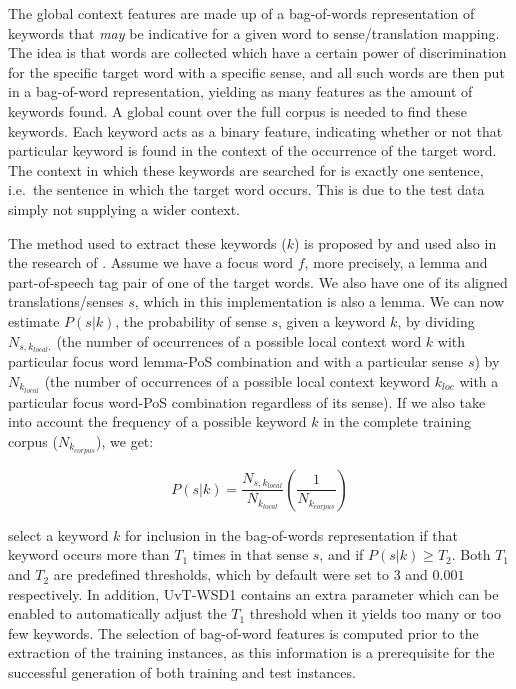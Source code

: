 The global context features are made up of a bag-of-words representation of
keywords that \emph{may} be indicative for a given word to sense/translation
mapping. The idea is that words are collected which have a certain power of
discrimination for the specific target word with a specific sense, and all such
words are then put in a bag-of-word representation, yielding as many features
as the amount of keywords found. A global count over the full corpus is needed
to find these keywords. Each keyword acts as a binary feature, indicating
whether or not that particular keyword is found in the context of the
occurrence of the target word. The context in which these keywords are searched
for is exactly one sentence, i.e.\ the sentence in which the target word occurs.
This is due to the test data simply not supplying a wider context.

The method used to extract these keywords ($k$) is proposed by \cite{NgL96} and
used also in the research of \cite{Hoste+02}. Assume we have a focus word $f$,
more precisely, a lemma and part-of-speech tag pair of one of the target words.
We also have one of its aligned translations/senses $s$, which in this
implementation is also a lemma. We can now estimate $P(s|k)$, the probability
of sense $s$, given a keyword $k$, by dividing $N_{s,k_{local}.}$ (the number
of occurrences of a possible local context word $k$ with particular focus word
lemma-PoS combination and with a particular sense $s$) by $N_{k_{local}}$ (the
number of occurrences of a possible local context keyword $k_{loc}$ with a
particular focus word-PoS combination regardless of its sense). If we also take
into account the frequency of a possible keyword $k$ in the complete training
corpus ($N_{k_{corpus}}$), we get:


\begin{equation}
P(s|k) = \frac{N_{s,k_{local}}}{N_{k_{local}}}(\frac{1}{N_{k_{corpus}}})
\end{equation}

\cite{Hoste+02} select a keyword $k$ for inclusion in the bag-of-words
representation if that keyword occurs more than $T_1$ times in that sense $s$,
and if $P(s|k) \ge T_2$. Both $T_1$ and $T_2$ are predefined thresholds, which
by default were set to $3$ and $0.001$ respectively. In addition, UvT-WSD1
contains an extra parameter which can be enabled to automatically adjust the
$T_1$ threshold when it yields too many or too few keywords. The selection of
bag-of-word features is computed prior to the extraction of the training
instances, as this information is a prerequisite for the successful generation
of both training and test instances.

